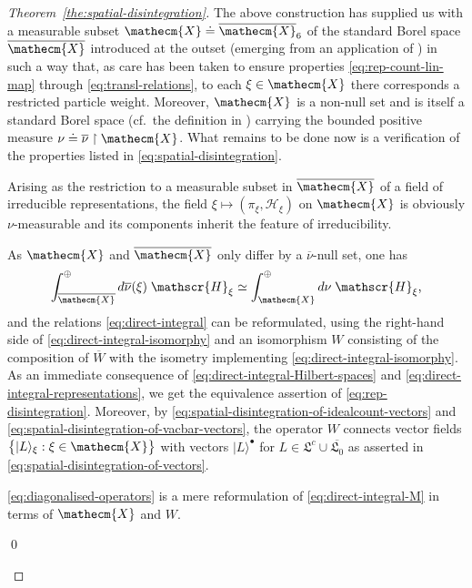 \documentclass[a4paper,a4paper]{article}
\numberwithin{equation}{section}
\newcommand{\Xecm}{\mathecm{X}}
\newcommand{\Hscr}{\mathscr{H}}
\newcommand{\Xecmbar}{\overline{\mathecm{X}}}
\newcommand{\Wbar}{\overline{W}}
\newcommand{\nubar}{\overline{\nu}}
\newcommand{\idealcount}{\mathfrak{L}^c}
\newcommand{\vacbar}{\overline{\mathfrak{L}_0}}
\newcounter{proofitem}
\newenvironment{prooflist}{\begin{list}{(\roman{proofitem})}%
  {\usecounter{proofitem} \setlength{\topsep}{0ex}%
   \setlength{\parsep}{0.2ex} \setlength{\itemsep}{0.4ex}%
   \setlength{\leftmargin}{0em} \setlength{\itemindent}{0.5em}%
   \setlength{\listparindent}{1em}}}{\qed \end{list}}
\theoremstyle{definition}
\theoremstyle{plain}
\theoremstyle{remark}
\theoremstyle{assumption}
\newcommand{\bset}[1]{\bigl\{ #1 \bigr\}}
\newcommand{\bullket}[1]{\vert #1 \rangle^\bullet}
\newcommand{\xiket}[1]{\vert #1 \rangle_\xi}
\begin{document}
\begin{proof}[Theorem~\ref{the:spatial-disintegration}]
    The above construction has supplied us with a measurable subset
    $\Xecm \doteq \Xecmbar_6$ of the standard Borel space $\Xecmbar$
    introduced at the outset (emerging from an application of
    \cite[Theorem~8.5.2]{dixmier:1982}) in such a way that, as care
    has been taken to ensure properties \eqref{eq:rep-count-lin-map}
    through \eqref{eq:transl-relations}, to each $\xi \in \Xecm$ there
    corresponds a restricted particle weight. Moreover, $\Xecm$ is a
    non-null set and is itself a standard Borel space (cf.~the
    definition in \cite[Section~3.3]{arveson:1976}) carrying the
    bounded positive measure $\nu \doteq \nubar \restriction \Xecm$.
    What remains to be done now is a verification of the properties
    listed in \eqref{eq:spatial-disintegration}.
    \begin{prooflist}
    \item Arising as the restriction to a measurable subset in
      $\Xecmbar$ of a field of irreducible representations, the field
      $\xi \mapsto ( \pi_\xi , \Hscr_\xi )$ on $\Xecm$ is obviously
      $\nu$-measurable and its components inherit the feature of
      irreducibility.
    \item As $\Xecm$ and $\Xecmbar$ only differ by a $\nubar$-null
      set, one has
      \begin{equation}
        \label{eq:direct-integral-isomorphy}
        \int_{\Xecmbar}^\oplus d \nubar ( \xi ) \; \Hscr_\xi \simeq
        \int_\Xecm^\oplus d \nu \; \Hscr_\xi \text{,}
      \end{equation}
      and the relations \eqref{eq:direct-integral} can be
      reformulated, using the right-hand side of
      \eqref{eq:direct-integral-isomorphy} and an isomorphism $W$
      consisting of the composition of $\Wbar$ with the isometry
      implementing \eqref{eq:direct-integral-isomorphy}. As an
      immediate consequence of
      \eqref{eq:direct-integral-Hilbert-spaces} and
      \eqref{eq:direct-integral-representations}, we get the
      equivalence assertion of \eqref{eq:rep-disintegration}.
      Moreover, by
      \eqref{eq:spatial-disintegration-of-idealcount-vectors} and
      \eqref{eq:spatial-disintegration-of-vacbar-vectors}, the
      operator $W$ connects vector fields $\bset{\xiket{L} : \xi \in
        \Xecm}$ with vectors $\bullket{L}$ for $L \in \idealcount \cup
      \vacbar$ as asserted in
      \eqref{eq:spatial-disintegration-of-vectors}.
    \item \eqref{eq:diagonalised-operators} is a mere reformulation of
      \eqref{eq:direct-integral-M} in terms of $\Xecm$ and $W$.

\end{prooflist}
\end{proof}
\end{document}
